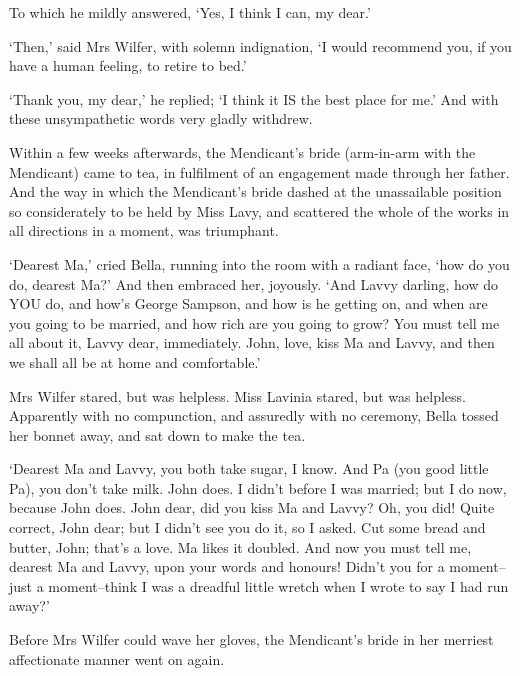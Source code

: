 To which he mildly answered, ‘Yes, I think I can, my dear.’

‘Then,’ said Mrs Wilfer, with solemn indignation, ‘I would recommend
you, if you have a human feeling, to retire to bed.’

‘Thank you, my dear,’ he replied; ‘I think it IS the best place for me.’
And with these unsympathetic words very gladly withdrew.

Within a few weeks afterwards, the Mendicant’s bride (arm-in-arm with
the Mendicant) came to tea, in fulfilment of an engagement made through
her father. And the way in which the Mendicant’s bride dashed at the
unassailable position so considerately to be held by Miss Lavy, and
scattered the whole of the works in all directions in a moment, was
triumphant.

‘Dearest Ma,’ cried Bella, running into the room with a radiant face,
‘how do you do, dearest Ma?’ And then embraced her, joyously. ‘And Lavvy
darling, how do YOU do, and how’s George Sampson, and how is he getting
on, and when are you going to be married, and how rich are you going
to grow? You must tell me all about it, Lavvy dear, immediately.
John, love, kiss Ma and Lavvy, and then we shall all be at home and
comfortable.’

Mrs Wilfer stared, but was helpless. Miss Lavinia stared, but was
helpless. Apparently with no compunction, and assuredly with no
ceremony, Bella tossed her bonnet away, and sat down to make the tea.

‘Dearest Ma and Lavvy, you both take sugar, I know. And Pa (you good
little Pa), you don’t take milk. John does. I didn’t before I was
married; but I do now, because John does. John dear, did you kiss Ma and
Lavvy? Oh, you did! Quite correct, John dear; but I didn’t see you do
it, so I asked. Cut some bread and butter, John; that’s a love. Ma likes
it doubled. And now you must tell me, dearest Ma and Lavvy, upon your
words and honours! Didn’t you for a moment--just a moment--think I was a
dreadful little wretch when I wrote to say I had run away?’

Before Mrs Wilfer could wave her gloves, the Mendicant’s bride in her
merriest affectionate manner went on again.

